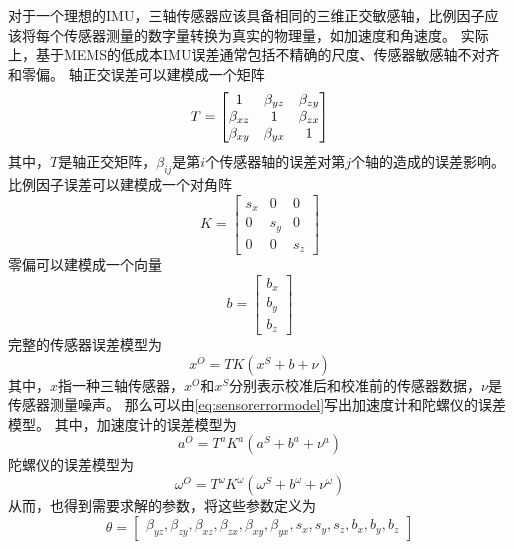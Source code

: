 \documentclass[
  type=master
]{gdutthesis}
\begin{document}
对于一个理想的IMU，三轴传感器应该具备相同的三维正交敏感轴，比例因子应该将每个传感器测量的数字量转换为真实的物理量，如加速度和角速度。
实际上，基于MEMS的低成本IMU误差通常包括不精确的尺度、传感器敏感轴不对齐和零偏。
轴正交误差可以建模成一个矩阵
\begin{equation}\label{eq:axiserror}
	T=
	\begin{bmatrix}
		1 & \beta_{yz} & \beta_{zy}\\
		\beta_{xz} & 1 & \beta_{zx}\\
		\beta_{xy} & \beta_{yx} & 1
	\end{bmatrix}\vspace{1ex}
\end{equation}
其中，$T$是轴正交矩阵，$\beta_{ij}$是第$i$个传感器轴的误差对第$j$个轴的造成的误差影响。
比例因子误差可以建模成一个对角阵
\begin{equation}\label{eq:scaleerror}
	K=
	\begin{bmatrix}
		s_x & 0 & 0\\
		0 & s_y & 0\\
		0 & 0 & s_z
	\end{bmatrix}
\end{equation}
零偏可以建模成一个向量
\begin{equation}\label{eq:scaleerror}
	b=
	\begin{bmatrix}
		b_x\\
		b_y\\
		b_z
	\end{bmatrix}
\end{equation}
完整的传感器误差模型为
\begin{equation}\label{eq:sensorerrormodel}
	x^O=T K (x^S + b + \nu)
\end{equation}
其中，$x$指一种三轴传感器，$x^O$和$x^S$分别表示校准后和校准前的传感器数据，$ν$是传感器测量噪声。
那么可以由\autoref{eq:sensorerrormodel}写出加速度计和陀螺仪的误差模型。
其中，加速度计的误差模型为
\begin{equation}
	a^O=T^a K^a (a^S + b^a + \nu^a)
\end{equation}
陀螺仪的误差模型为
\begin{equation}\label{eq:accerrormodel}
	\omega^O=T^\omega K^\omega (\omega^S + b^\omega + \nu^\omega)
\end{equation}
从而，也得到需要求解的参数，将这些参数定义为
\begin{equation}\label{eq:thetadef}
	\theta = 
	\begin{bmatrix}
		\beta_{yz},\beta_{zy},\beta_{xz},\beta_{zx},\beta_{xy}, \beta_{yx},s_x,s_y,s_z,b_x,b_y,b_z
	\end{bmatrix}
\end{equation}
\end{document}
